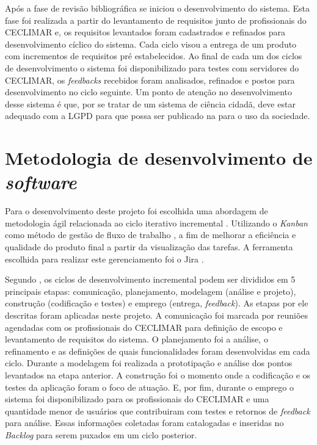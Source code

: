 Após a fase de revisão bibliográfica se iniciou o desenvolvimento do sistema. Esta fase foi realizada a 
partir do levantamento de requisitos junto de profissionais do CECLIMAR e, os requisitos levantados foram 
cadastrados e refinados para desenvolvimento cíclico do sistema. Cada ciclo visou a entrega de um produto 
com incrementos de requisitos pré estabelecidos. Ao final de cada um dos ciclos de desenvolvimento o sistema 
foi disponibilizado para testes com servidores do CECLIMAR, os \textit{feedbacks} recebidos foram analisados, 
refinados e postos para desenvolvimento no ciclo seguinte. Um ponto de atenção no desenvolvimento desse 
sistema é que, por se tratar de um sistema de ciência cidadã, deve estar adequado com a LGPD para que possa 
ser publicado na  para o uso da sociedade.

\section{Metodologia de desenvolvimento de \textit{software}}\label{sec:metodologia-desenv-software}
Para o desenvolvimento deste projeto foi escolhida uma abordagem de metodologia ágil relacionada 
ao ciclo iterativo incremental \cite{pressman2011engenharia}. Utilizando o \textit{Kanban} como 
método de gestão de fluxo de trabalho \cite{ohno1988toyota}, a fim de melhorar a eficiência e qualidade do produto 
final a partir da visualização das tarefas. A ferramenta escolhida para realizar este 
gerenciamento foi o Jira \cite{atlassian_jira_2025}.

Segundo , os ciclos de desenvolvimento incremental podem ser 
divididos em 5 principais etapas: comunicação, planejamento, modelagem (análise e projeto), construção 
(codificação e testes) e emprego (entrega, \textit{feedback}). As etapas por ele descritas foram 
aplicadas neste projeto.
A comunicação foi marcada por reuniões agendadas com os profissionais do CECLIMAR para definição de
 escopo e levantamento de requisitos do sistema. O planejamento foi a análise, o refinamento e as 
 definições de quais funcionalidades foram desenvolvidas em cada ciclo. Durante a modelagem foi 
 realizada a prototipação e análise dos pontos levantados na etapa anterior. A construção foi o 
 momento onde a codificação e os testes da aplicação foram o foco de atuação. E, por fim, durante 
 o emprego o sistema 
 foi disponibilizado para os profissionais do CECLIMAR e uma 
 quantidade menor de usuários que contribuiram com 
 testes e retornos de \textit{feedback} para análise. Essas informações coletadas 
 foram catalogadas e inseridas no \textit{Backlog} 
 para serem puxados em um ciclo posterior.

